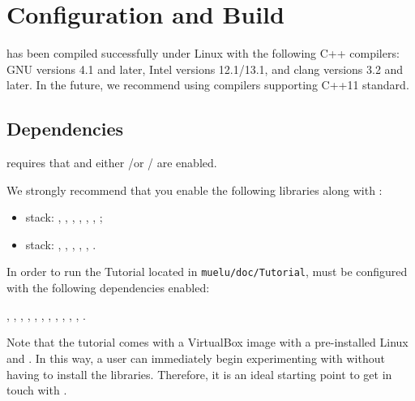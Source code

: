 \section{Configuration and Build}
\label{sec:configuration and build}

\muelu{} has been compiled successfully under Linux with the following C++
compilers: GNU versions 4.1 and later, Intel versions 12.1/13.1, and clang versions 3.2 and later.
In the future, we recommend using compilers supporting C++11 standard.

\subsection{Dependencies}


\muelu{} requires that \teuchos{} and either \epetra/\ifpack or \tpetra/\ifpacktwo
are enabled.


We strongly recommend that you enable the following \trilinos libraries along with \muelu:

\begin{itemize}
  \item \epetra stack: \aztecoo, \epetra, \amesos, \ifpack, \isorropia, \galeri,
    \zoltan;
  \item \tpetra stack: \amesostwo, \belos, \galeri, \ifpacktwo, \tpetra,
    \zoltantwo.
\end{itemize}


In order to run the \muelu{} Tutorial \cite{MueLuTutorial} located in \verb!muelu/doc/Tutorial!, \muelu{} must be configured with the following
dependencies enabled:

  \aztecoo, \amesos, \amesostwo, \belos, \epetra, \ifpack, \ifpacktwo, \isorropia,
  \galeri, \tpetra, \zoltan, \zoltantwo.

\begin{mycomment}
Note that the \muelu{} tutorial \cite{MueLuTutorial} comes with a VirtualBox image with a pre-installed
Linux and \trilinos{}.   In this way, a user can immediately begin experimenting with \muelu{} without
having to install the \trilinos{} libraries. Therefore, it is an ideal starting point to get in touch with \muelu{}.
\end{mycomment}


